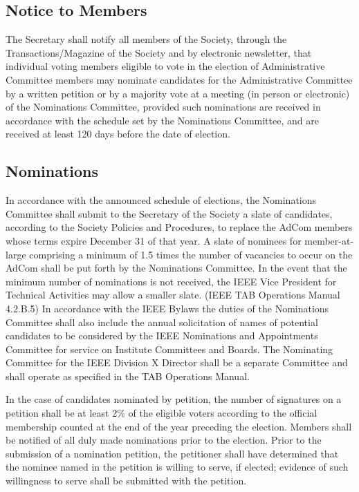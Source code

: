 \documentclass[10pt]{article}
\begin{document}
\subsection{Notice to Members}

The Secretary shall notify all members of the Society, through the Transactions/Magazine of the Society and by electronic newsletter, that individual voting members eligible to vote in the election of Administrative Committee members may nominate candidates for the Administrative Committee by a written petition or by a majority vote at a meeting (in person or electronic) of the Nominations Committee, provided such nominations are received in accordance with the schedule set by the Nominations Committee, and are received at least 120 days before the date of election. 


\subsection{Nominations}
In accordance with the announced schedule of elections, the Nominations Committee shall submit to the Secretary of the Society a slate of candidates, according to the Society Policies and Procedures, to replace the AdCom members whose terms expire December 31 of that year. A slate of nominees for member-at-large comprising a minimum of 1.5 times the number of vacancies to occur on the AdCom shall be put forth by the Nominations Committee. In the event that the minimum number of nominations is not received, the IEEE Vice President for Technical Activities may allow a smaller slate. (IEEE TAB Operations Manual 4.2.B.5) In accordance with the IEEE Bylaws the duties of the Nominations Committee shall also include the annual solicitation of names of potential candidates to be considered by the IEEE Nominations and Appointments Committee for service on Institute Committees and Boards. The Nominating Committee for the IEEE Division X Director shall be a separate Committee and shall operate as specified in the TAB Operations Manual.

In the case of candidates nominated by petition, the number of signatures on a petition shall be at least 2\% of the eligible voters according to the official membership counted at the end of the year preceding the election. Members shall be notified of all duly made nominations prior to the election.  Prior to the submission of a nomination petition, the petitioner shall have determined that the nominee named in the petition is willing to serve, if elected; evidence of such willingness to serve shall be submitted with the petition. 
\end{document}

